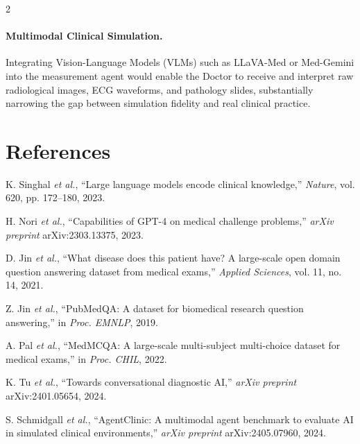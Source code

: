 \documentclass[10pt, a4paper]{article}
\begin{document}
\begin{multicols}{2}
\paragraph{Multimodal Clinical Simulation.}
Integrating Vision-Language Models (VLMs) such as LLaVA-Med or Med-Gemini into the measurement agent would enable the Doctor to receive and interpret raw radiological images, ECG waveforms, and pathology slides, substantially narrowing the gap between simulation fidelity and real clinical practice.

\section*{References}
\begin{footnotesize}
\begin{enumerate}[label={[\arabic*]}, leftmargin=*, itemsep=2pt]

\item\label{ref:singhal} K. Singhal \textit{et al.}, ``Large language models encode clinical knowledge,'' \textit{Nature}, vol. 620, pp. 172–180, 2023.

\item\label{ref:nori} H. Nori \textit{et al.}, ``Capabilities of GPT-4 on medical challenge problems,'' \textit{arXiv preprint} arXiv:2303.13375, 2023.

\item\label{ref:jin_medqa} D. Jin \textit{et al.}, ``What disease does this patient have? A large-scale open domain question answering dataset from medical exams,'' \textit{Applied Sciences}, vol. 11, no. 14, 2021.

\item\label{ref:jin_pubmedqa} Z. Jin \textit{et al.}, ``PubMedQA: A dataset for biomedical research question answering,'' in \textit{Proc. EMNLP}, 2019.

\item\label{ref:pal} A. Pal \textit{et al.}, ``MedMCQA: A large-scale multi-subject multi-choice dataset for medical exams,'' in \textit{Proc. CHIL}, 2022.

\item\label{ref:tu} K. Tu \textit{et al.}, ``Towards conversational diagnostic AI,'' \textit{arXiv preprint} arXiv:2401.05654, 2024.

\item\label{ref:schmidgall} S. Schmidgall \textit{et al.}, ``AgentClinic: A multimodal agent benchmark to evaluate AI in simulated clinical environments,'' \textit{arXiv preprint} arXiv:2405.07960, 2024.


\end{enumerate}
\end{footnotesize}
\end{multicols}
\end{document}
